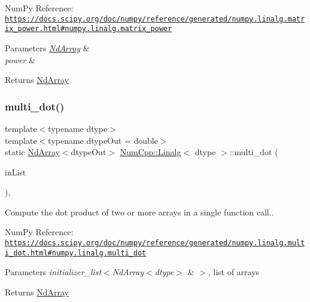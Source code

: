 Num\+Py Reference\+: \href{https://docs.scipy.org/doc/numpy/reference/generated/numpy.linalg.matrix_power.html#numpy.linalg.matrix_power}{\tt https\+://docs.\+scipy.\+org/doc/numpy/reference/generated/numpy.\+linalg.\+matrix\+\_\+power.\+html\#numpy.\+linalg.\+matrix\+\_\+power}


\begin{DoxyParams}{Parameters}
{\em \mbox{\hyperlink{class_num_cpp_1_1_nd_array}{Nd\+Array}}} & \\
\hline
{\em power} & \\
\hline
\end{DoxyParams}
\begin{DoxyReturn}{Returns}
\mbox{\hyperlink{class_num_cpp_1_1_nd_array}{Nd\+Array}} 
\end{DoxyReturn}
\mbox{\label{class_num_cpp_1_1_linalg_ac8a5b85861915e24241b5ab4629572c5}} 
\subsubsection{\texorpdfstring{multi\+\_\+dot()}{multi\_dot()}}
{\footnotesize\ttfamily template$<$typename dtype$>$ \\
template$<$typename dtype\+Out  = double$>$ \\
static \mbox{\hyperlink{class_num_cpp_1_1_nd_array}{Nd\+Array}}$<$dtype\+Out$>$ \mbox{\hyperlink{class_num_cpp_1_1_linalg}{Num\+Cpp\+::\+Linalg}}$<$ dtype $>$\+::multi\+\_\+dot (\begin{DoxyParamCaption}\item[{const std\+::initializer\+\_\+list$<$ \mbox{\hyperlink{class_num_cpp_1_1_nd_array}{Nd\+Array}}$<$ dtype $>$ $>$ \&}]{in\+List }\end{DoxyParamCaption})\hspace{0.3cm}{\ttfamily [inline]}, {\ttfamily [static]}}

Compute the dot product of two or more arrays in a single function call..

Num\+Py Reference\+: \href{https://docs.scipy.org/doc/numpy/reference/generated/numpy.linalg.multi_dot.html#numpy.linalg.multi_dot}{\tt https\+://docs.\+scipy.\+org/doc/numpy/reference/generated/numpy.\+linalg.\+multi\+\_\+dot.\+html\#numpy.\+linalg.\+multi\+\_\+dot}


\begin{DoxyParams}{Parameters}
{\em initializer\+\_\+list$<$\+Nd\+Array$<$dtype$>$} & $>$, list of arrays\\
\hline
\end{DoxyParams}
\begin{DoxyReturn}{Returns}
\mbox{\hyperlink{class_num_cpp_1_1_nd_array}{Nd\+Array}} 
\end{DoxyReturn}
\mbox{\label{class_num_cpp_1_1_linalg_a83adbdf05319bb6be6ea3729b3b1c93e}} 
